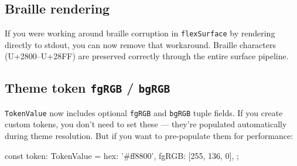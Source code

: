 \subsection{Braille rendering}\label{record-266-braille-rendering}

If you were working around braille corruption in \texttt{f\allowbreak{}l\allowbreak{}e\allowbreak{}x\allowbreak{}S\allowbreak{}u\allowbreak{}r\allowbreak{}f\allowbreak{}a\allowbreak{}c\allowbreak{}e} by rendering directly to stdout, you can now remove that workaround. Braille characters (U+2800--U+28FF) are preserved correctly through the entire surface pipeline.

\subsection{\texorpdfstring{Theme token \texttt{f\allowbreak{}g\allowbreak{}R\allowbreak{}G\allowbreak{}B} / \texttt{b\allowbreak{}g\allowbreak{}R\allowbreak{}G\allowbreak{}B}}{Theme token  / }}\label{record-266-theme-token-fgrgb-bgrgb}

\texttt{T\allowbreak{}o\allowbreak{}k\allowbreak{}e\allowbreak{}n\allowbreak{}V\allowbreak{}a\allowbreak{}l\allowbreak{}u\allowbreak{}e} now includes optional \texttt{f\allowbreak{}g\allowbreak{}R\allowbreak{}G\allowbreak{}B} and \texttt{b\allowbreak{}g\allowbreak{}R\allowbreak{}G\allowbreak{}B} tuple fields. If you create custom tokens, you don't need to set these --- they're populated automatically during theme resolution. But if you want to pre-populate them for performance:

\begin{CodeBlock}
const token: TokenValue = {
  hex: '#ff8800',
  fgRGB: [255, 136, 0],
};
\end{CodeBlock}

